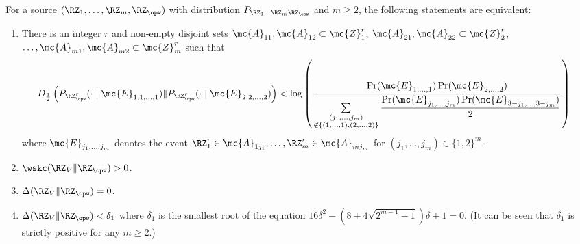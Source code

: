 \begin{theorem}\label{thm:multivariate_positivity}
 For a source $(\RZ_1,\ldots,\RZ_m,\RZ_{\opw})$ with distribution $P_{\RZ_1 \ldots \RZ_m \RZ_{\opw}}$ and $m \geq 2$, the following statements are equivalent:
 \begin{enumerate}
  \item There is an integer $r$ and non-empty disjoint sets $\mc{A}_{11},\mc{A}_{12} \subset \mc{Z}_1^r$, $\mc{A}_{21},\mc{A}_{22} \subset \mc{Z}_2^r$, $\ldots, \mc{A}_{m1},\mc{A}_{m2} \subset \mc{Z}_m^r$ such that
  \begin{align*}
       &D_{\frac{1}{2}} \left(P_{\RZ_{\opw}^r}(\cdot \mid \mc{E}_{1, 1, \ldots, 1})  
       \| P_{\RZ_{\opw}^r}(\cdot \mid \mc{E}_{2, 2, \ldots, 2}) \right)%
       < \log \left(\frac{\Pr(\mc{E}_{1, \ldots, 1})\Pr(\mc{E}_{2, \ldots, 2})}{\sum \limits_{\substack{(j_1,\ldots,j_m)\\ \not\in \{(1,\ldots,1),(2,\ldots,2)\}}}\dfrac{\Pr(\mc{E}_{j_1, \ldots, j_m})\Pr(\mc{E}_{3-j_1,\ldots, 3-j_m})}{2}}\right)
 \end{align*}
 where  $\mc{E}_{j_1, \ldots, j_m}$ denotes the event $\RZ_1^r \in \mc{A}_{1j_1}, \ldots, \RZ_m^r \in \mc{A}_{mj_m}$ for $(j_1,\ldots,j_m) \in \{1, 2\}^m$.
 

 \item $\wskc(\RZ_V \| \RZ_{\opw}) > 0$.
 \item $\Delta(\RZ_V \| \RZ_{\opw}) = 0$.
 \item $\Delta(\RZ_V \| \RZ_{\opw}) < \delta_1$ where $\delta_1$ is the smallest root of the equation $16\delta^2-(8+4\sqrt{2^{m-1}-1})\delta+1=0$. (It can be seen that $\delta_1$ is strictly positive for any $m\geq 2$.)
\end{enumerate}
\end{theorem}

